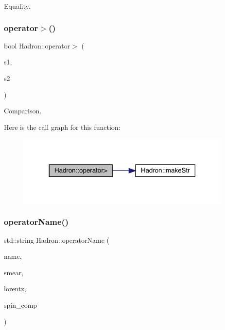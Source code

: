 Equality. 

\mbox{\label{namespaceHadron_a341b896434c5621c127ef5066c50c7f0}} 
\subsubsection{\texorpdfstring{operator$>$()}{operator>()}}
{\footnotesize\ttfamily bool Hadron\+::operator$>$ (\begin{DoxyParamCaption}\item[{const \mbox{\hyperlink{structHadron_1_1HadronVertex__t}{Hadron\+Vertex\+\_\+t}} \&}]{s1,  }\item[{const \mbox{\hyperlink{structHadron_1_1HadronVertex__t}{Hadron\+Vertex\+\_\+t}} \&}]{s2 }\end{DoxyParamCaption})}



Comparison. 

Here is the call graph for this function\+:
\nopagebreak
\begin{figure}[H]
\begin{center}
\leavevmode
\includegraphics[width=305pt]{d1/daf/namespaceHadron_a341b896434c5621c127ef5066c50c7f0_cgraph}
\end{center}
\end{figure}
\mbox{\label{namespaceHadron_a8f8a77c02a6415ffc31d2a300f59e6a6}} 
\subsubsection{\texorpdfstring{operatorName()}{operatorName()}}
{\footnotesize\ttfamily std\+::string Hadron\+::operator\+Name (\begin{DoxyParamCaption}\item[{const std\+::string \&}]{name,  }\item[{const std\+::string \&}]{smear,  }\item[{const \mbox{\hyperlink{classXMLArray_1_1Array}{Array}}$<$ int $>$ \&}]{lorentz,  }\item[{int}]{spin\+\_\+comp }\end{DoxyParamCaption})}



